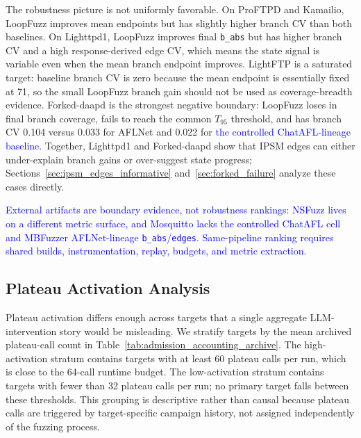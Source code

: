 \documentclass[final,5p,times,number]{elsarticle}
\begin{document}
The robustness picture is not uniformly favorable. On ProFTPD and Kamailio, LoopFuzz improves mean endpoints but has slightly higher branch CV than both baselines. On Lighttpd1, LoopFuzz improves final \texttt{b\_abs} but has higher branch CV and a high response-derived edge CV, which means the state signal is variable even when the mean branch endpoint improves. LightFTP is a saturated target: baseline branch CV is zero because the mean endpoint is essentially fixed at 71, so the small LoopFuzz branch gain should not be used as coverage-breadth evidence. Forked-daapd is the strongest negative boundary: LoopFuzz loses in final branch coverage, fails to reach the common $T_{95}$ threshold, and has branch CV 0.104 versus 0.033 for AFLNet and 0.022 for \textcolor{blue}{the controlled ChatAFL-lineage baseline}. Together, Lighttpd1 and Forked-daapd show that IPSM edges can either under-explain branch gains or over-suggest state progress; Sections~\ref{sec:ipsm_edges_informative} and~\ref{sec:forked_failure} analyze these cases directly.

\textcolor{blue}{External artifacts are boundary evidence, not robustness rankings: NSFuzz lives on a different metric surface, and Mosquitto lacks the controlled ChatAFL cell and MBFuzzer AFLNet-lineage \texttt{b\_abs}/\texttt{edges}. Same-pipeline ranking requires shared builds, instrumentation, replay, budgets, and metric extraction.}

\subsection{Plateau Activation Analysis}
\label{sec:plateau_activation_analysis}

Plateau activation differs enough across targets that a single aggregate LLM-intervention story would be misleading. We stratify targets by the mean archived plateau-call count in Table~\ref{tab:admission_accounting_archive}. The high-activation stratum contains targets with at least 60 plateau calls per run, which is close to the 64-call runtime budget. The low-activation stratum contains targets with fewer than 32 plateau calls per run; no primary target falls between these thresholds. This grouping is descriptive rather than causal because plateau calls are triggered by target-specific campaign history, not assigned independently of the fuzzing process.
\end{document}
